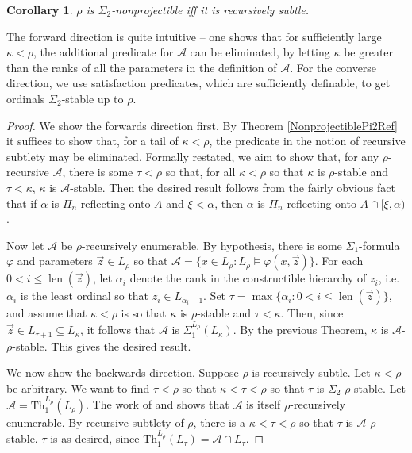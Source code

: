 \documentclass{article}
\theoremstyle{definition}
\theoremstyle{plain}
\theoremstyle{plain}
\theoremstyle{plain}
\theoremstyle{plain}
\newtheorem{corollary}[definition]{Corollary}
\theoremstyle{remark}
\theoremstyle{remark}
\theoremstyle{remark}
\theoremstyle{plain}
\theoremstyle{plain}
\theoremstyle{plain}
\begin{document}
\begin{corollary}
\label{MainTheorem}
$\rho$ is $\Sigma_2$-nonprojectible iff it is recursively subtle.
\end{corollary}

The forward direction is quite intuitive -- one shows that for sufficiently large $\kappa < \rho$, the additional predicate for $\mathcal{A}$ can be eliminated, by letting $\kappa$ be greater than the ranks of all the parameters in the definition of $\mathcal{A}$. For the converse direction, we use satisfaction predicates, which are sufficiently definable, to get ordinals $\Sigma_2$-stable up to $\rho$.

\begin{proof}
We show the forwards direction first. By Theorem \ref{NonprojectiblePi2Ref} it suffices to show that, for a tail of $\kappa < \rho$, the predicate in the notion of recursive subtlety may be eliminated. Formally restated, we aim to show that, for any $\rho$-recursive $\mathcal{A}$, there is some $\tau < \rho$ so that, for all $\kappa < \rho$ so that $\kappa$ is $\rho$-stable and $\tau < \kappa$, $\kappa$ is $\mathcal{A}$-stable. Then the desired result follows from the fairly obvious fact that if $\alpha$ is $\Pi_n$-reflecting onto $A$ and $\xi < \alpha$, then $\alpha$ is $\Pi_n$-reflecting onto $A \cap [\xi, \alpha)$.

Now let $\mathcal{A}$ be $\rho$-recursively enumerable. By hypothesis, there is some $\Sigma_1$-formula $\varphi$ and parameters $\vec{z} \in L_\rho$ so that $\mathcal{A} = \{x \in L_\rho: L_\rho \models \varphi(x, \vec{z})\}$. For each $0 < i \leq \operatorname{len}(\vec{z})$, let $\alpha_i$ denote the rank in the constructible hierarchy of $z_i$, i.e. $\alpha_i$ is the least ordinal so that $z_i \in L_{\alpha_i + 1}$. Set $\tau = \max\{\alpha_i: 0 < i \leq \operatorname{len}(\vec{z})\}$, and assume that $\kappa < \rho$ is so that $\kappa$ is $\rho$-stable and $\tau < \kappa$. Then, since $\vec{z} \in L_{\tau+1} \subseteq L_\kappa$, it follows that $\mathcal{A}$ is $\Sigma_1^{L_\rho}(L_\kappa)$. By the previous Theorem, $\kappa$ is $\mathcal{A}$-$\rho$-stable. This gives the desired result.

We now show the backwards direction. Suppose $\rho$ is recursively subtle. Let $\kappa < \rho$ be arbitrary. We want to find $\tau < \rho$ so that $\kappa < \tau < \rho$ so that $\tau$ is $\Sigma_2$-$\rho$-stable. Let $\mathcal{A} = \mathrm{Th}_1^{L_\rho}(L_\rho)$. The work of \cite{levy} and \cite{friedman} shows that $\mathcal{A}$ is itself $\rho$-recursively enumerable. By recursive subtlety of $\rho$, there is a $\kappa < \tau < \rho$ so that $\tau$ is $\mathcal{A}$-$\rho$-stable. $\tau$ is as desired, since $\mathrm{Th}_1^{L_\rho}(L_\tau) = \mathcal{A} \cap L_\tau$.
\end{proof}
\end{document}
